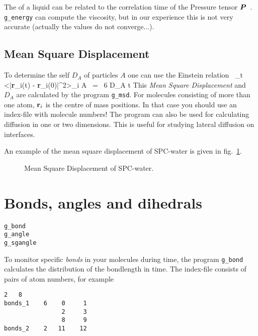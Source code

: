 The  of a liquid can be related to the correlation 
time of the Pressure tensor $\mbox{\boldmath ${P}$}$~\cite{PSmith93c,Balasubramanian96}.
{\tt g\_energy} can compute the viscosity, but in our experience this is not very
accurate (actually the values do not converge...).

\subsection{Mean Square Displacement}
\label{sec:msd}
To determine the self  $D_A$ of particles $A$ one
can use the Einstein relation~\cite{Allen87} \beq \lim_{t \rightarrow
\infty} <|{\bf r}_i(t) - {\bf r}_i(0)|^2>_{i \in A} ~=~ 6 D_A t \eeq
This {\em Mean Square Displacement} and $D_A$ are calculated by the
program {\tt g\_msd}. For molecules consisting of more than one atom,
${\bf r}_i$ is the centre of mass positions. In that case you should
use an index-file with molecule numbers! The program can also be used
for calculating diffusion in one or two dimensions. This is useful for
studying lateral diffusion on interfaces. 

An example of the mean square displacement of SPC-water is given in
fig.~\ref{fig:msdwater}.
%
\begin{figure}[hbtp]
\centerline{
{}}
\caption{Mean Square Displacement of SPC-water.}
\label{fig:msdwater}
\end{figure}
%

% 
% 
\section{Bonds, angles and dihedrals}
\label{sec:bad}
\begin{verbatim}
g_bond
g_angle
g_sgangle
\end{verbatim}
To monitor specific {\em bonds} in your molecules during time, the program 
{\tt g\_bond} calculates the distribution of the bondlength in time. 
The index-file consists of pairs of atom numbers, for example
\begin{verbatim}
2   8
bonds_1    6    0     1
                2     3
                8     9
bonds_2    2   11    12
\end{verbatim}

